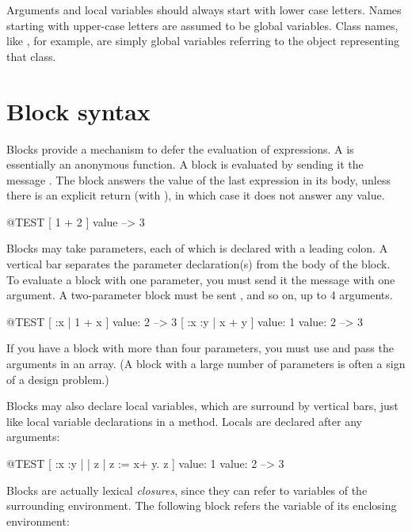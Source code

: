 \documentclass[a4paper,10pt,twoside]{book}
\begin{document}
Arguments and local variables should always start with lower case letters.
Names starting with upper-case letters are assumed to be global variables.
Class names, like , for example, are simply global variables referring to the object representing that class.

\section{Block syntax}

Blocks provide a mechanism to defer the evaluation of expressions.
A  is essentially an anonymous function. A block is evaluated by sending it the message .
The block answers the value of the last expression in its body, unless there is an explicit return (with \ct{^}), in which case it does not answer any value.

\begin{code}{@TEST}
[ 1 + 2 ] value --> 3
\end{code}

Blocks may take parameters, each of which is declared with a leading colon.
A  vertical bar separates the parameter declaration(s) from the body of the block.
To evaluate a block with one parameter, you must send it the message  with one argument.
A two-parameter block must be sent , and so on, up to 4 arguments.

\begin{code}{@TEST}
[ :x | 1 + x ] value: 2 --> 3
[ :x :y | x + y ] value: 1 value: 2 --> 3
\end{code}

If you have a block with more than four parameters, you must use  and pass the arguments in an array.
(A block with a large number of parameters is often a sign of a design problem.)

Blocks may also declare local variables, which are surround by vertical bars, just like local variable declarations in a method.
Locals are declared after any arguments:

\begin{code}{@TEST}
[ :x :y | | z | z := x+ y. z ] value: 1 value: 2 --> 3
\end{code}

Blocks are actually lexical \emph{closures}, since they can refer to variables of the surrounding environment.
The following block refers the variable  of its enclosing environment:
\end{document}
